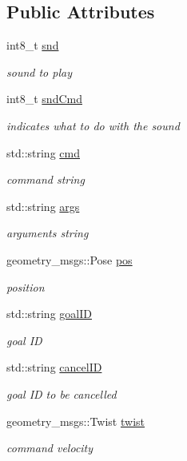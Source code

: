 \subsection*{Public Attributes}
\begin{DoxyCompactItemize}
\item 
int8\-\_\-t \hyperlink{classTestHelper_a299ac5a385d8e910a22980601f9ad4c4}{snd}
\begin{DoxyCompactList}\small\item\em sound to play \end{DoxyCompactList}\item 
int8\-\_\-t \hyperlink{classTestHelper_ab91e5c0bcd313b9e629b389bbecabb90}{snd\-Cmd}
\begin{DoxyCompactList}\small\item\em indicates what to do with the sound \end{DoxyCompactList}\item 
std\-::string \hyperlink{classTestHelper_ad5acc4b246653a6c073c6dc100344a86}{cmd}
\begin{DoxyCompactList}\small\item\em command string \end{DoxyCompactList}\item 
std\-::string \hyperlink{classTestHelper_a7ab9b6d8f65899ab6c99dfa1538bad30}{args}
\begin{DoxyCompactList}\small\item\em arguments string \end{DoxyCompactList}\item 
geometry\-\_\-msgs\-::\-Pose \hyperlink{classTestHelper_a095ebfa14c22f6057c1385a70f65b9b6}{pos}
\begin{DoxyCompactList}\small\item\em position \end{DoxyCompactList}\item 
std\-::string \hyperlink{classTestHelper_a3d1422616cebc2df38b8766f42864f43}{goal\-I\-D}
\begin{DoxyCompactList}\small\item\em goal I\-D \end{DoxyCompactList}\item 
std\-::string \hyperlink{classTestHelper_afc27bc11999e9ca916e1983f2355a69e}{cancel\-I\-D}
\begin{DoxyCompactList}\small\item\em goal I\-D to be cancelled \end{DoxyCompactList}\item 
geometry\-\_\-msgs\-::\-Twist \hyperlink{classTestHelper_a78a826fd3e1a4bc10adc910cde81668d}{twist}
\begin{DoxyCompactList}\small\item\em command velocity \end{DoxyCompactList}\end{DoxyCompactItemize}


